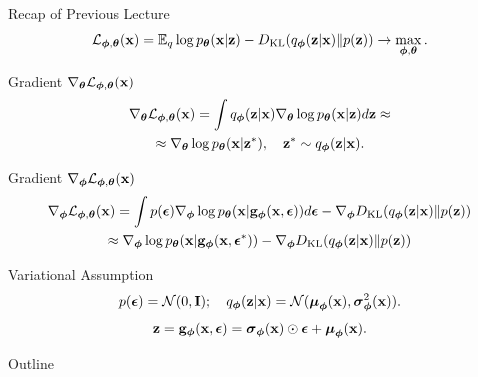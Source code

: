 \documentclass{beamer}
\begin{document}
\begin{frame}{Recap of Previous Lecture}
	\vspace{-0.3cm}
	\[
		\cL_{\bphi, \btheta}(\bx)  = \bbE_{q} \log \pt(\bx | \bz) - \KL(q_{\bphi}(\bz| \bx) \| p(\bz)) \rightarrow \max_{\bphi, \btheta}.
	\]
	\vspace{-0.3cm}
	\begin{block}{Gradient $\nabla_{\btheta} \cL_{\bphi, \btheta}(\bx)$}
		\vspace{-0.8cm}
		\begin{multline*}
			\nabla_{\btheta}\cL_{\bphi, \btheta}(\bx)
			= \int q_{\bphi}(\bz| \bx) \nabla_{\btheta}\log \pt(\bx| \bz) d \bz \approx  \\
			\approx \nabla_{\btheta}\log \pt(\bx|\bz^*), \quad \bz^* \sim q_{\bphi}(\bz| \bx).
		\end{multline*}
		\vspace{-0.7cm}
	\end{block}
	\begin{block}{Gradient $\nabla_{\bphi} \cL_{\bphi, \btheta}(\bx)$}
		\vspace{-0.8cm}
		\begin{multline*}
			\nabla_{\bphi}\cL_{\bphi, \btheta}(\bx) = \int p(\bepsilon) \nabla_{\bphi} \log \pt(\bx | \bg_{\bphi}(\bx, \bepsilon)) d\bepsilon  - \nabla_{\bphi} \KL(q_{\bphi}(\bz| \bx) \| p(\bz))
			\\ \approx \nabla_{\bphi} \log \pt(\bx | \bg_{\bphi}(\bx, \bepsilon^*))  - \nabla_{\bphi} \KL(q_{\bphi}(\bz| \bx) \| p(\bz))
		\end{multline*}
		\vspace{-0.5cm}
	\end{block}
	\vspace{-0.3cm}
	\begin{block}{Variational Assumption}
		\vspace{-0.3cm}
		\[
			p(\bepsilon) = \cN(0, \bI); \quad  q_{\bphi}(\bz| \bx) = \cN (\bmu_{\bphi}(\bx), \bsigma^2_{\bphi}(\bx)).
		\]
		\[
			\bz = \bg_{\bphi}(\bx, \bepsilon) = \bsigma_{\bphi}(\bx) \odot \bepsilon + \bmu_{\bphi}(\bx).
		\]
	\end{block}
\end{frame}
\begin{frame}{Outline}
	\tableofcontents
\end{frame}
\end{document}
